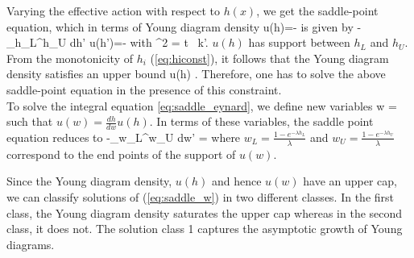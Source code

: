 \documentclass[3p,12pt]{elsarticle}
\numberwithin{equation}{section}
\begin{document}
%
Varying the effective action with respect to $h(x)$, we get the saddle-point equation, which in terms of Young diagram density 
\ben
u(h)=-
\een
is given by
%
\be
\label{eq:saddle_eynard}
\Xint-_{h_L}^{h_U} dh' u(h')=- \log{}
\ee
%
with
\ben
\xi^2 = t \ k'.
\een
$u(h)$ has support between $h_L$ and $h_U$. From the monotonicity of $h_i$ (\ref{eq:hiconst}), it follows that the Young diagram density satisfies an upper bound
\ben
u(h) .
\een
Therefore, one has to solve the above saddle-point equation in the presence of this constraint.\\
To solve the integral equation \eqref{eq:saddle_eynard}, we define new variables
\be\label{eq:hwrelation}
w = 
\ee
such that $u(w)= \frac{dh}{dw}u(h)$. 
In terms of these variables, the saddle point equation reduces to
%
\be
\label{eq:saddle_w}
\Xint-_{w_L}^{w_U} dw'  =  \log {}
\ee
%
where $w_L=\frac{1-e^{-\lambda h_L}}{\lambda}$ and $w_U=\frac{1-e^{-\lambda h_U}}{\lambda}$ correspond to the end points of the support of $u(w)$.

Since the Young diagram density, $u(h)$ and hence $u(w)$ have an upper cap, we can classify solutions of (\ref{eq:saddle_w}) in two different classes. In the first class, the Young diagram density saturates the upper cap whereas in the second class, it does not. The solution class 1 captures the asymptotic growth of Young diagrams.
\end{document}
